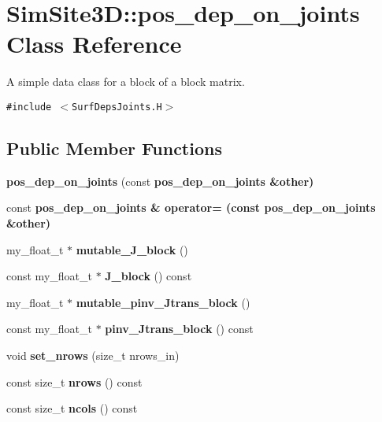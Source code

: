 \section{SimSite3D::pos\_\-dep\_\-on\_\-joints Class Reference}
\label{classSimSite3D_1_1pos__dep__on__joints}
A simple data class for a block of a block matrix.  


{\tt \#include $<$Surf\-Deps\-Joints.H$>$}

\subsection*{Public Member Functions}
\begin{CompactItemize}
\item 
\textbf{pos\_\-dep\_\-on\_\-joints} (const \bf{pos\_\-dep\_\-on\_\-joints} \&other)\label{classSimSite3D_1_1pos__dep__on__joints_a4d2e825eaa2ae2553a8d7f2d66ed89f}

\item 
const \bf{pos\_\-dep\_\-on\_\-joints} \& \textbf{operator=} (const \bf{pos\_\-dep\_\-on\_\-joints} \&other)\label{classSimSite3D_1_1pos__dep__on__joints_39042623fb7f7515fcd7d32bd90650d7}

\item 
my\_\-float\_\-t $\ast$ \textbf{mutable\_\-J\_\-block} ()\label{classSimSite3D_1_1pos__dep__on__joints_85b245396b5836c8d29c4416fbea415e}

\item 
const my\_\-float\_\-t $\ast$ \textbf{J\_\-block} () const \label{classSimSite3D_1_1pos__dep__on__joints_9ee419794ff9722634571b40d782db0b}

\item 
my\_\-float\_\-t $\ast$ \textbf{mutable\_\-pinv\_\-Jtrans\_\-block} ()\label{classSimSite3D_1_1pos__dep__on__joints_3fca56953be29994e0ccbdbfbbc10e3d}

\item 
const my\_\-float\_\-t $\ast$ \textbf{pinv\_\-Jtrans\_\-block} () const \label{classSimSite3D_1_1pos__dep__on__joints_872dca61f0aab268dc6e1e6410839d4f}

\item 
void \textbf{set\_\-nrows} (size\_\-t nrows\_\-in)\label{classSimSite3D_1_1pos__dep__on__joints_8f0c3af5f80ff453a25725814fe066fb}

\item 
const size\_\-t \textbf{nrows} () const \label{classSimSite3D_1_1pos__dep__on__joints_cd80bf7a3eec0bf71a98096e781ea4f3}

\item 
const size\_\-t \textbf{ncols} () const \label{classSimSite3D_1_1pos__dep__on__joints_e7b83cb4f3741807ad2d3d18d3a54ec4}

\end{CompactItemize}
